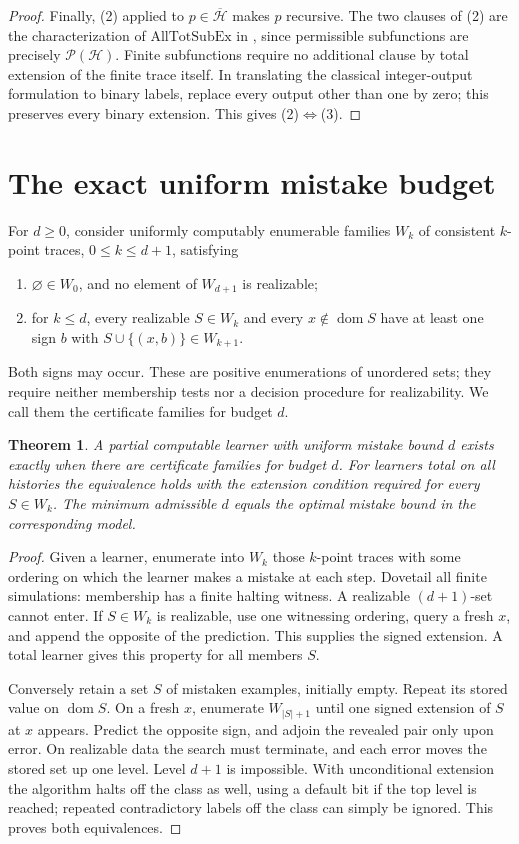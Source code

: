 \documentclass[11pt]{article}
\newtheorem{theorem}{Theorem}
\newcommand{\cl}{\overline{\mathcal H}}
\newcommand{\HH}{\mathcal H}
\newcommand{\dom}{\operatorname{dom}}
\begin{document}
\begin{proof}
Finally, (2) applied to $p\in\cl$ makes $p$ recursive. The two clauses of (2) are the characterization of $\mathrm{AllTotSubEx}$ in \cite[Corollary~40]{jkw}, since permissible subfunctions are precisely $\mathcal P(\HH)$. Finite subfunctions require no additional clause by total extension of the finite trace itself. In translating the classical integer-output formulation to binary labels, replace every output other than one by zero; this preserves every binary extension. This gives (2)$\Leftrightarrow$(3).
\end{proof}

\section{The exact uniform mistake budget}
For $d\ge0$, consider uniformly computably enumerable families $W_k$ of consistent $k$-point traces, $0\le k\le d+1$, satisfying
\begin{enumerate}
\item $\varnothing\in W_0$, and no element of $W_{d+1}$ is realizable;
\item for $k\le d$, every realizable $S\in W_k$ and every $x\notin\dom S$ have at least one sign $b$ with $S\cup\{(x,b)\}\in W_{k+1}$.
\end{enumerate}
Both signs may occur. These are positive enumerations of unordered sets; they require neither membership tests nor a decision procedure for realizability. We call them the certificate families for budget $d$.
\begin{theorem}\label{uniform}
A partial computable learner with uniform mistake bound $d$ exists exactly when there are certificate families for budget $d$. For learners total on all histories the equivalence holds with the extension condition required for every $S\in W_k$. The minimum admissible $d$ equals the optimal mistake bound in the corresponding model.
\end{theorem}
\begin{proof}
Given a learner, enumerate into $W_k$ those $k$-point traces with some ordering on which the learner makes a mistake at each step. Dovetail all finite simulations: membership has a finite halting witness. A realizable $(d+1)$-set cannot enter. If $S\in W_k$ is realizable, use one witnessing ordering, query a fresh $x$, and append the opposite of the prediction. This supplies the signed extension. A total learner gives this property for all members $S$.

Conversely retain a set $S$ of mistaken examples, initially empty. Repeat its stored value on $\dom S$. On a fresh $x$, enumerate $W_{|S|+1}$ until one signed extension of $S$ at $x$ appears. Predict the opposite sign, and adjoin the revealed pair only upon error. On realizable data the search must terminate, and each error moves the stored set up one level. Level $d+1$ is impossible. With unconditional extension the algorithm halts off the class as well, using a default bit if the top level is reached; repeated contradictory labels off the class can simply be ignored. This proves both equivalences.
\end{proof}
\end{document}
